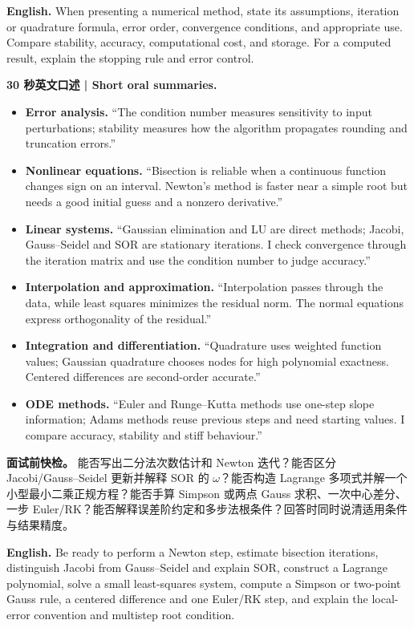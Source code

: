 \documentclass[UTF8,11pt,a4paper]{ctexart}
\newcommand{\EN}[1]{\par\noindent\textbf{English.} #1\par}
\begin{document}
\EN{When presenting a numerical method, state its assumptions, iteration or quadrature formula, error order, convergence conditions, and appropriate use. Compare stability, accuracy, computational cost, and storage. For a computed result, explain the stopping rule and error control.}

\noindent\textbf{30 秒英文口述 | Short oral summaries.}
\begin{itemize}
\item \textbf{Error analysis.} “The condition number measures sensitivity to input perturbations; stability measures how the algorithm propagates rounding and truncation errors.”
\item \textbf{Nonlinear equations.} “Bisection is reliable when a continuous function changes sign on an interval. Newton's method is faster near a simple root but needs a good initial guess and a nonzero derivative.”
\item \textbf{Linear systems.} “Gaussian elimination and LU are direct methods; Jacobi, Gauss--Seidel and SOR are stationary iterations. I check convergence through the iteration matrix and use the condition number to judge accuracy.”
\item \textbf{Interpolation and approximation.} “Interpolation passes through the data, while least squares minimizes the residual norm. The normal equations express orthogonality of the residual.”
\item \textbf{Integration and differentiation.} “Quadrature uses weighted function values; Gaussian quadrature chooses nodes for high polynomial exactness. Centered differences are second-order accurate.”
\item \textbf{ODE methods.} “Euler and Runge--Kutta methods use one-step slope information; Adams methods reuse previous steps and need starting values. I compare accuracy, stability and stiff behaviour.”
\end{itemize}

\noindent\textbf{面试前快检。} 能否写出二分法次数估计和 Newton 迭代？能否区分 Jacobi/Gauss--Seidel 更新并解释 SOR 的 $\omega$？能否构造 Lagrange 多项式并解一个小型最小二乘正规方程？能否手算 Simpson 或两点 Gauss 求积、一次中心差分、一步 Euler/RK？能否解释误差阶约定和多步法根条件？回答时同时说清适用条件与结果精度。
\EN{Be ready to perform a Newton step, estimate bisection iterations, distinguish Jacobi from Gauss--Seidel and explain SOR, construct a Lagrange polynomial, solve a small least-squares system, compute a Simpson or two-point Gauss rule, a centered difference and one Euler/RK step, and explain the local-error convention and multistep root condition.}
\end{document}
